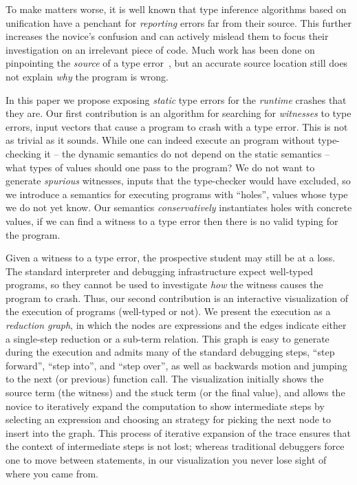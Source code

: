To make matters worse, it is well known that type inference algorithms
based on unification have a penchant for \emph{reporting} errors far
from their source.
%
This further increases the novice's confusion and can actively mislead
them to focus their investigation on an irrelevant piece of code.
%
Much work has been done on pinpointing the \emph{source} of a type
error~\cite{lerner_searching_2007,chen_counter-factual_2014,zhang_toward_2014,pavlinovic_finding_2014},
but an accurate source location still does not explain \emph{why} the
program is wrong.

In this paper we propose exposing \emph{static} type errors for the
\emph{runtime} crashes that they are.
%
Our first contribution is an algorithm for searching for
\emph{witnesses} to type errors, \ie input vectors that cause a program
to crash with a type error.
%
This is not as trivial as it sounds.
%
While one can indeed execute an \ocaml program without type-checking it
-- the dynamic semantics do not depend on the static semantics -- what
types of values should one pass to the program?
%
We do not want to generate \emph{spurious} witnesses, inputs that the
type-checker would have excluded, so we introduce a semantics for
executing \ocaml programs with ``holes'', values whose type we do not
yet know.
%
%
Our semantics \emph{conservatively} instantiates holes with concrete
values, if we can find a witness to a type error then there is no valid
typing for the program.

Given a witness to a type error, the prospective \ocaml student may
still be at a loss.
%
The standard \ocaml interpreter and debugging infrastructure expect
well-typed programs, so they cannot be used to investigate \emph{how}
the witness causes the program to crash.
%
Thus, our second contribution is an interactive visualization of the
execution of \ocaml programs (well-typed or not).
%
We present the execution as a \emph{reduction graph}, in which the nodes
are expressions and the edges indicate either a single-step reduction or
a sub-term relation.
%
This graph is easy to generate during the execution and admits many of
the standard debugging steps, \eg ``step forward'', ``step into'', and
``step over'', as well as backwards motion and jumping to the next (or
previous) function call.
%
The visualization initially shows the source term (\ie the witness) and
the stuck term (or the final value), and allows the novice to
iteratively expand the computation to show intermediate steps by
selecting an expression and choosing an strategy for picking the next
node to insert into the graph.
%
This process of iterative expansion of the trace ensures that the
context of intermediate steps is not lost; whereas traditional debuggers
force one to move between statements, in our visualization you never
lose sight of where you came from.

